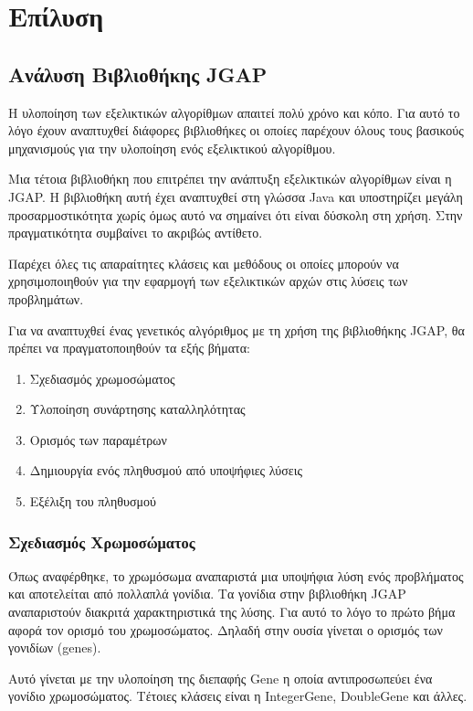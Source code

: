 \section{Επίλυση}

\subsection{Ανάλυση Βιβλιοθήκης JGAP}

Η υλοποίηση των εξελικτικών αλγορίθμων απαιτεί πολύ χρόνο και κόπο. Για αυτό το λόγο έχουν αναπτυχθεί διάφορες βιβλιοθήκες οι οποίες παρέχουν όλους τους βασικούς  μηχανισμούς για την υλοποίηση ενός εξελικτικού αλγορίθμου.

Μια τέτοια βιβλιοθήκη που επιτρέπει την ανάπτυξη εξελικτικών αλγορίθμων είναι η JGAP. Η βιβλιοθήκη αυτή έχει αναπτυχθεί στη γλώσσα Java και υποστηρίζει μεγάλη προσαρμοστικότητα χωρίς όμως αυτό να σημαίνει ότι είναι δύσκολη στη χρήση. Στην πραγματικότητα συμβαίνει το ακριβώς αντίθετο. 

Παρέχει όλες τις απαραίτητες κλάσεις και μεθόδους οι οποίες μπορούν να χρησιμοποιηθούν για την εφαρμογή των εξελικτικών αρχών στις λύσεις των προβλημάτων. \cite{Meffert}

Για να αναπτυχθεί ένας γενετικός αλγόριθμος με τη χρήση της βιβλιοθήκης JGAP, θα πρέπει να πραγματοποιηθούν τα εξής βήματα: \cite{zotero-R7UV9N25}

\begin{enumerate}
  \item Σχεδιασμός χρωμοσώματος
  \item Υλοποίηση συνάρτησης καταλληλότητας
  \item Ορισμός των παραμέτρων 
  \item Δημιουργία ενός πληθυσμού από υποψήφιες λύσεις
  \item Εξέλιξη του πληθυσμού
\end{enumerate}

\subsubsection{Σχεδιασμός Χρωμοσώματος}

Όπως αναφέρθηκε, το χρωμόσωμα αναπαριστά μια υποψήφια λύση ενός προβλήματος και αποτελείται από πολλαπλά γονίδια. Τα γονίδια στην βιβλιοθήκη JGAP αναπαριστούν διακριτά χαρακτηριστικά της λύσης. Για αυτό το λόγο το πρώτο βήμα αφορά τον ορισμό του χρωμοσώματος. Δηλαδή στην ουσία γίνεται ο ορισμός των γονιδίων (genes).

Αυτό γίνεται με την υλοποίηση της διεπαφής Gene η οποία αντιπροσωπεύει ένα γονίδιο χρωμοσώματος. Τέτοιες κλάσεις είναι η IntegerGene, DoubleGene και άλλες. 

